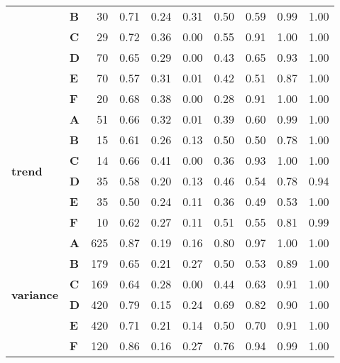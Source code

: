 \begin{table}
\begin{tabular}{llrrrrrrrr}
\textbf{} & \textbf{B} & 30 & 0.71 & 0.24 & 0.31 & 0.50 & 0.59 & 0.99 & 1.00 \\
\textbf{} & \textbf{C} & 29 & 0.72 & 0.36 & 0.00 & 0.55 & 0.91 & 1.00 & 1.00 \\
\textbf{} & \textbf{D} & 70 & 0.65 & 0.29 & 0.00 & 0.43 & 0.65 & 0.93 & 1.00 \\
\textbf{} & \textbf{E} & 70 & 0.57 & 0.31 & 0.01 & 0.42 & 0.51 & 0.87 & 1.00 \\
\textbf{} & \textbf{F} & 20 & 0.68 & 0.38 & 0.00 & 0.28 & 0.91 & 1.00 & 1.00 \\
\cline{1-10}
\multirow[t]{6}{*}{\textbf{trend}} & \textbf{A} & 51 & 0.66 & 0.32 & 0.01 & 0.39 & 0.60 & 0.99 & 1.00 \\
\textbf{} & \textbf{B} & 15 & 0.61 & 0.26 & 0.13 & 0.50 & 0.50 & 0.78 & 1.00 \\
\textbf{} & \textbf{C} & 14 & 0.66 & 0.41 & 0.00 & 0.36 & 0.93 & 1.00 & 1.00 \\
\textbf{} & \textbf{D} & 35 & 0.58 & 0.20 & 0.13 & 0.46 & 0.54 & 0.78 & 0.94 \\
\textbf{} & \textbf{E} & 35 & 0.50 & 0.24 & 0.11 & 0.36 & 0.49 & 0.53 & 1.00 \\
\textbf{} & \textbf{F} & 10 & 0.62 & 0.27 & 0.11 & 0.51 & 0.55 & 0.81 & 0.99 \\
\cline{1-10}
\multirow[t]{6}{*}{\textbf{variance}} & \textbf{A} & 625 & 0.87 & 0.19 & 0.16 & 0.80 & 0.97 & 1.00 & 1.00 \\
\textbf{} & \textbf{B} & 179 & 0.65 & 0.21 & 0.27 & 0.50 & 0.53 & 0.89 & 1.00 \\
\textbf{} & \textbf{C} & 169 & 0.64 & 0.28 & 0.00 & 0.44 & 0.63 & 0.91 & 1.00 \\
\textbf{} & \textbf{D} & 420 & 0.79 & 0.15 & 0.24 & 0.69 & 0.82 & 0.90 & 1.00 \\
\textbf{} & \textbf{E} & 420 & 0.71 & 0.21 & 0.14 & 0.50 & 0.70 & 0.91 & 1.00 \\
\textbf{} & \textbf{F} & 120 & 0.86 & 0.16 & 0.27 & 0.76 & 0.94 & 0.99 & 1.00 \\
\cline{1-10}
\bottomrule
\end{tabular}
\end{table}
